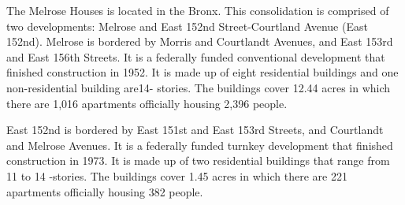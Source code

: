 The Melrose Houses is located in the Bronx. This consolidation is comprised of two developments: Melrose and East 152nd Street-Courtland Avenue (East 152nd). Melrose is bordered by Morris and Courtlandt Avenues, and East 153rd and East 156th Streets. It is a federally funded conventional development that finished construction in 1952. It is made up of eight residential buildings and one non-residential building are14- stories. The buildings cover 12.44 acres in which there are 1,016 apartments officially housing 2,396 people. \par \vspace{.7\baselineskip}East 152nd is bordered by East 151st and East 153rd Streets, and Courtlandt and Melrose Avenues. It is a federally funded turnkey development that finished construction in 1973. It is made up of two residential buildings that range from 11 to 14 -stories. The buildings cover 1.45 acres in which there are 221 apartments officially housing 382 people.